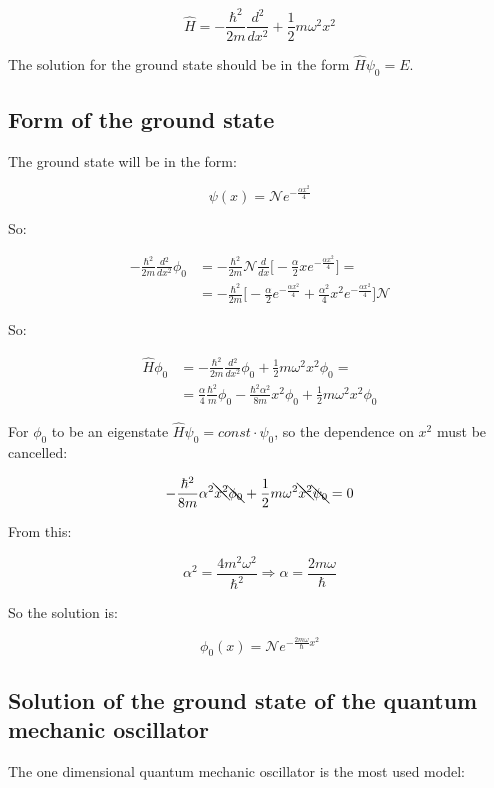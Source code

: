 $$\hat{H} = - \frac{\hbar^2}{2m}\frac{d{^2}}{d{x^2}} +\frac{1}{2}m\omega^2 x^2$$

The solution for the ground state should be in the form $\hat{H}\psi_0 = E$.

  \subsection{Form of the ground state}
  The ground state will be in the form:

  $$\psi(x) = \mathcal{N}e^{-\frac{\alpha x^2}{4}}$$

  So:

  \begin{align*}
    -\frac{\hbar^2}{2m}\frac{d{^2}}{d{x^2}}\phi_0 &= -\frac{\hbar^2}{2m}\mathcal{N}\frac{d{}}{d{x}}\biggl[-\frac{\alpha}{2}xe^{-\frac{\alpha x^2}{4}}\biggr]=\\
                                                  &= -\frac{\hbar^2}{2m}\biggl[-\frac{\alpha}{2}e^{-\frac{\alpha x^2}{4}}+\frac{\alpha^2}{4}x^2e^{-\frac{\alpha x^2}{4}}\biggr]\mathcal{N}
  \end{align*}

  So:

  \begin{align*}
    \hat{H}\phi_0 &= -\frac{\hbar^2}{2m}\frac{d{^2}}{d{x^2}}\phi_0 + \frac{1}{2}m\omega^2x^2\phi_0=\\
                  &= \frac{\alpha}{4}\frac{\hbar^2}{m}\phi_0 -\frac{\hbar^2\alpha^2}{8m}x^2\phi_0 + \frac{1}{2}m\omega^2x^2\phi_0
  \end{align*}

  For $\phi_0$ to be an eigenstate $\hat{H}\psi_0 = const\cdot\psi_0$, so the dependence on $x^2$ must be cancelled:

  $$-\frac{\hbar^2}{8m}\alpha^2\bcancel{x^2}\bcancel{\phi_0} + \frac{1}{2}m\omega^2\bcancel{x^2}\bcancel{\psi_0} = 0$$

  From this:

  $$\alpha^2 = \frac{4m^2\omega^2}{\hbar^2}\Rightarrow\alpha=\frac{2m\omega}{\hbar}$$

  So the solution is:

  $$\phi_0(x) = \mathcal{N}e^{-\frac{2m\omega}{\hbar}x^2}$$

  \subsection{Solution of the ground state of the quantum mechanic oscillator}
  The one dimensional quantum mechanic oscillator is the most used model:


